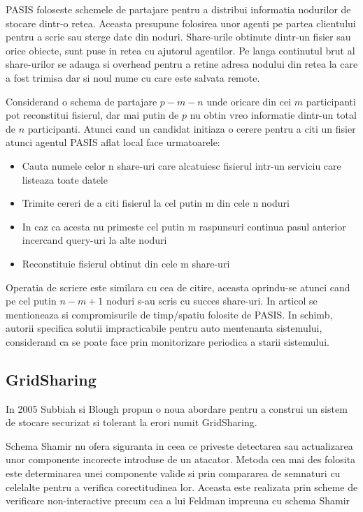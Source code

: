 \documentclass{llncs}
\begin{document}
PASIS foloseste schemele de partajare pentru a distribui informatia nodurilor de stocare dintr-o retea. Aceasta presupune folosirea unor agenti pe partea clientului pentru a scrie sau sterge date din noduri. Share-urile obtinute dintr-un fisier sau orice obiecte, sunt puse in retea cu ajutorul agentilor. Pe langa continutul brut al share-urilor se adauga si overhead pentru a retine adresa nodului din retea la care a fost trimisa dar si noul nume cu care este salvata remote.

Considerand o schema de partajare $p-m-n$ unde oricare din cei $m$ participanti pot reconstitui fisierul, dar mai putin de $p$ nu obtin vreo informatie dintr-un total de $n$ participanti. Atunci cand un candidat initiaza o cerere pentru a citi un fisier atunci agentul PASIS aflat local face urmatoarele: 
\begin{itemize}
	\item Cauta numele celor n share-uri care alcatuiesc fisierul intr-un serviciu care listeaza toate datele
	\item Trimite cereri de a citi fisierul la cel putin m din cele n noduri
	\item In caz ca acesta nu primeste cel putin m raspunsuri continua pasul anterior incercand query-uri la alte noduri
	\item Reconstituie fisierul obtinut din cele m share-uri
\end{itemize}
Operatia de scriere este similara cu cea de citire, aceasta oprindu-se atunci cand pe cel putin $n - m + 1$ noduri s-au scris cu succes share-uri.
In articol se mentioneaza si compromisurile de timp/spatiu folosite de PASIS. In schimb, autorii specifica solutii impracticabile pentru auto mentenanta sistemului, considerand ca se poate face prin monitorizare periodica a starii sistemului.

\subsection{GridSharing} 
In 2005 Subbiah si Blough propun o noua abordare pentru a construi un sistem de stocare securizat si tolerant la erori numit GridSharing. \cite{SB:2005}

Schema Shamir nu ofera siguranta in ceea ce priveste detectarea sau actualizarea unor componente incorecte introduse de un atacator. Metoda cea mai des folosita este determinarea unei componente valide si prin compararea de semnaturi %
cu celelalte pentru a verifica corectitudinea lor. Aceasta este realizata prin scheme de verificare non-interactive precum cea a lui Feldman impreuna cu schema Shamir \cite{Feldman:1987}
\end{document}

